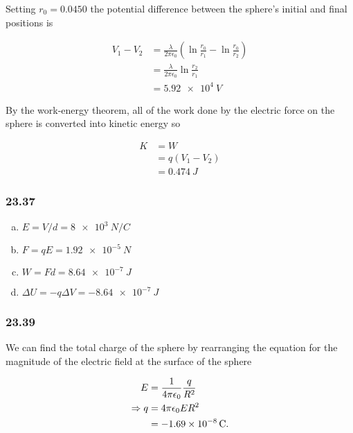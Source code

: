 \documentclass{article}
\begin{document}
Setting $r_0 = 0.0450$ the potential difference between the sphere's initial and final positions is

\begin{align*}
  V_1 - V_2 & = \frac{\lambda}{2 \pi \epsilon_0} \left( \ln \frac{r_0}{r_1} - \ln \frac{r_0}{r_2} \right) \\
            & = \frac{\lambda}{2 \pi \epsilon_0} \ln \frac{r_2}{r_1}                                      \\
            & = \qty{5.92e4}{V}
\end{align*}

By the work-energy theorem, all of the work done by the electric force on the sphere is converted into kinetic energy so

\begin{align*}
  K & = W              \\
    & = q (V_1 - V_2)  \\
    & = \qty{0.474}{J}
\end{align*}

\subsubsection{23.37}

\begin{enumerate}[a)]
  \item $E = V / d = \qty{8e3}{N/C}$

  \item $F = q E = \qty{1.92e-5}{N}$

  \item $W = F d = \qty{8.64e-7}{J}$

  \item $\Delta U = -q \Delta V = \qty{-8.64e-7}{J}$
\end{enumerate}

\subsubsection{23.39}

We can find the total charge of the sphere by rearranging the equation for the magnitude of the electric field at the surface of the sphere

\begin{align*}
  E             & = \frac{1}{4 \pi \epsilon_0} \frac{q}{R^2}      \\
  \Rightarrow q & = 4 \pi \epsilon_0 E R^2 \\
                & = \qty{-1.69e-8}{C}.
\end{align*}
\end{document}
